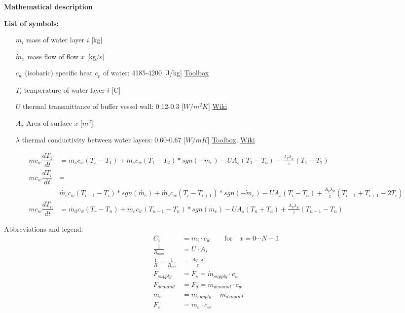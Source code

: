 \textbf{Mathematical description}

\textbf{List of symbols:}

\begin{itemize}
	\item [$m_i$] {mass of water layer $i$ [kg]}
	\item [$\dot{m}_x$] {mass flow of flow $x$ [kg/s]}
	\item [$c_w$] {(isobaric) specific heat $c_p$ of water: 4185-4200 [J/kg]} \href{https://www.engineeringtoolbox.com/specific-heat-capacity-water-d_660.html}{Toolbox}
	\item [$T_i$] {temperature of water layer $i$ [\textdegree C]}
	\item [$U$] {thermal transmittance of buffer vessel wall: 0.12-0.3 [$W/m^2K$]} \href{https://en.wikipedia.org/wiki/Thermal_transmittance}{Wiki}
	\item [$A_x$] {Area of  surface $x$ [\(m^2\)]}
	\item [$\lambda$] {thermal conductivity between water layers: 0.60-0.67 [$W/mK$]} \href{https://www.engineeringtoolbox.com/water-liquid-gas-thermal-conductivity-temperature-pressure-d_2012.html}{Toolbox}, \href{https://en.wikipedia.org/wiki/Thermal_conductivity_and_resistivity}{Wiki}
\end{itemize}

\begin{equation}
	\begin{aligned}
		\label{eq:Buffer vessel layers}
	    mc_w \dfrac{dT_1}{dt} &=
	    \dot{m_s}c_w(T_s - T_1) + \dot{m_e}c_w(T_1 - T_2)*sgn(\dot{-m_e}) - UA_s(T_1 - T_a) - \frac{A_q\lambda_w}{z}(T_1-T_2) \\
	    mc_w \dfrac{dT_i}{dt} &= \\
	    & \dot{m_e}c_w(T_{i-1} - T_{i})*sgn(\dot{m_e}) + \dot{m_e}c_w(T_{i} - T_{i+1})*sgn(\dot{-m_e}) - UA_s(T_i - T_a) + \frac{A_q\lambda_w}{z}(T_{i-1} + T_{i+1} - 2T_i) \\
   	    mc_w \dfrac{dT_n}{dt} &= 
   	    \dot{m_d}c_w(T_r - T_n) + \dot{m_e}c_w(T_{n-1} - T_n)*sgn(\dot{m_e}) - UA_s(T_n + T_a) + \frac{A_q\lambda_w}{z}(T_{n-1}-T_n)		
	\end{aligned}
\end{equation}

Abbreviations and legend:
	\begin{equation}
		\begin{aligned}
			C_i &= m_i \cdot c_{w} \qquad \text{for} \quad x =  0 \cdots N-1 \\
			\frac{1}{R_{amb}} &= U \cdot A_s \\
			\frac{1}{R} = \frac{1}{R_{int}} &= \frac{Aq \cdot \lambda}{z} \\
			F_{supply} &= F_s = \dot{m}_{supply} \cdot c_{w} \\
			F_{demand} &= F_d = \dot{m}_{demand} \cdot c_{w} \\
			\dot{m}_e &= \dot{m}_{supply} - \dot{m}_{demand} \\
			F_e &= \dot{m}_{e} \cdot c_{w} 
		\end{aligned}
	\end{equation}

